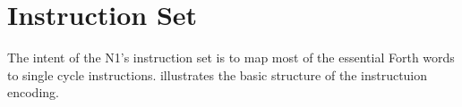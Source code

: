 
\section{Instruction Set}
\label{opcodes}

The intent of the N1's instruction set is to map most of the essential Forth words
to single cycle instructions.  illustrates the basic structure
of the instructuion encoding.

